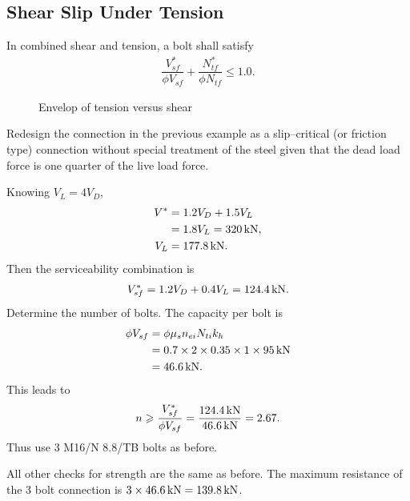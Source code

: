 \subsection{Shear Slip Under Tension}\label{sec:bolt_combined_s}
In combined shear and tension, a bolt shall satisfy
\begin{gather}
\dfrac{V^*_{sf}}{\phi{}V_{sf}}+\dfrac{N^*_{tf}}{\phi{}N_{tf}}\leqslant1.0.
\end{gather}
\begin{figure}[H]
\centering\caption{Envelop of tension versus shear}
\end{figure}

\begin{exmp}
Redesign the connection in the previous example as a slip--critical (or friction type) connection without special treatment of the steel given that the dead load force is one quarter of the live load force.
\end{exmp}
\begin{solution}
Knowing $V_L=4V_D$,
\begin{align*}
V^*&=1.2V_D+1.5V_L\\&=1.8V_L=\SI{320}{\kilo\newton},\\
V_L&=\SI{177.8}{\kilo\newton}.
\end{align*}
Then the serviceability combination is
\begin{gather*}
V^*_{sf}=1.2V_D+0.4V_L=\SI{124.4}{\kilo\newton}.
\end{gather*}
Determine the number of bolts. The capacity per bolt is
\begin{align*}
\phi{}V_{sf}&=\phi{}\mu_sn_{ei}N_{ti}k_h\\
&=0.7\times2\times0.35\times1\times\SI{95}{\kilo\newton}\\
&=\SI{46.6}{\kilo\newton}.
\end{align*}
This leads to
\begin{gather*}
n\geqslant\dfrac{V^*_{sf}}{\phi{}V_{sf}}=\dfrac{\SI{124.4}{\kilo\newton}}{\SI{46.6}{\kilo\newton}}=2.67.
\end{gather*}
Thus use 3 M16/N 8.8/TB bolts as before.

All other checks for strength are the same as before. The maximum resistance of the 3 bolt connection is $3\times\SI{46.6}{\kilo\newton}=\SI{139.8}{\kilo\newton}$.
\end{solution}